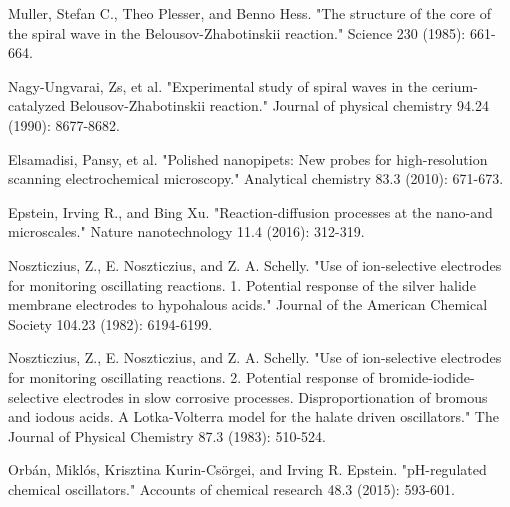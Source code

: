 \documentclass[3p, twocolumn]{elsarticle}
\begin{document}
\begin{thebibliography}{5}
Muller, Stefan C., Theo Plesser, and Benno Hess. "The structure of the core of the spiral wave in the Belousov-Zhabotinskii reaction." Science 230 (1985): 661-664.

 Nagy-Ungvarai, Zs, et al. "Experimental study of spiral waves in the cerium-catalyzed Belousov-Zhabotinskii reaction." Journal of physical chemistry 94.24 (1990): 8677-8682.

Elsamadisi, Pansy, et al. "Polished nanopipets: New probes for high-resolution scanning electrochemical microscopy." Analytical chemistry 83.3 (2010): 671-673.

Epstein, Irving R., and Bing Xu. "Reaction-diffusion processes at the nano-and microscales." Nature nanotechnology 11.4 (2016): 312-319.

Noszticzius, Z., E. Noszticzius, and Z. A. Schelly. "Use of ion-selective electrodes for monitoring oscillating reactions. 1. Potential response of the silver halide membrane electrodes to hypohalous acids." Journal of the American Chemical Society 104.23 (1982): 6194-6199.

Noszticzius, Z., E. Noszticzius, and Z. A. Schelly. "Use of ion-selective electrodes for monitoring oscillating reactions. 2. Potential response of bromide-iodide-selective electrodes in slow corrosive processes. Disproportionation of bromous and iodous acids. A Lotka-Volterra model for the halate driven oscillators." The Journal of Physical Chemistry 87.3 (1983): 510-524.

Orbán, Miklós, Krisztina Kurin-Csörgei, and Irving R. Epstein. "pH-regulated chemical oscillators." Accounts of chemical research 48.3 (2015): 593-601.
\end{thebibliography}
\end{document}
